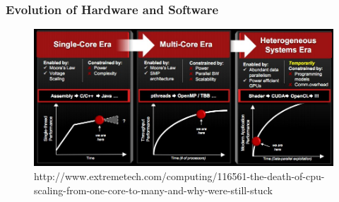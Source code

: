 \documentclass[12pt]{beamer}
\begin{document}
\begin{frame}
\frametitle{Evolution of Hardware and Software}
\begin{figure}
\includegraphics[width=\textwidth]{img/amdscaling}
\caption{http://www.extremetech.com/computing/116561-the-death-of-cpu-scaling-from-one-core-to-many-and-why-were-still-stuck}
\end{figure}
\end{frame}
\end{document}
